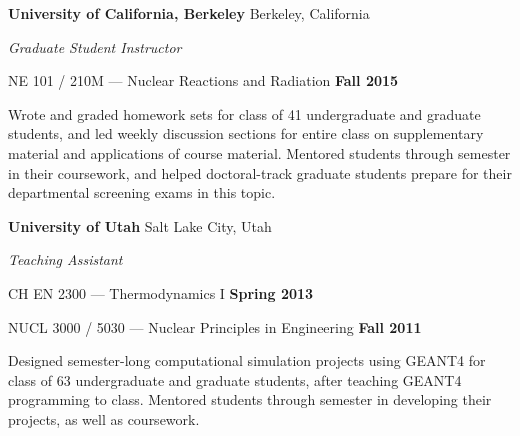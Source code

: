 
{\bf University of California, Berkeley} \hfill{ Berkeley, California}

\vspace*{-.05in}
{\em Graduate Student Instructor} 

\begin{list2}
\item NE 101 / 210M --- Nuclear Reactions and Radiation  \hfill {\bf Fall 2015}

\begin{list1}
\item[] Wrote and graded homework sets  for class of 41
undergraduate and graduate students, and led weekly discussion sections for entire class on supplementary material and applications of course material.
Mentored students through semester in their coursework, and helped doctoral-track graduate students prepare for their departmental screening exams in this topic.

\vspace*{.05in}  

\end{list1}
\end{list2}

{\bf University of Utah} \hfill{ Salt Lake City, Utah}

\vspace*{-.05in}
{\em Teaching Assistant} 

% 
\begin{list2}
\item CH EN 2300 ---  Thermodynamics I \hfill {\bf Spring 2013}
\item NUCL 3000 / 5030 ---  Nuclear Principles in Engineering \hfill {\bf Fall 2011}






\begin{list1}
\item[] Designed semester-long computational simulation projects using GEANT4 for class of 63
undergraduate and graduate students, after teaching GEANT4 programming to class.
Mentored students through semester in developing their projects, as well as coursework.

\end{list1}
\end{list2}


